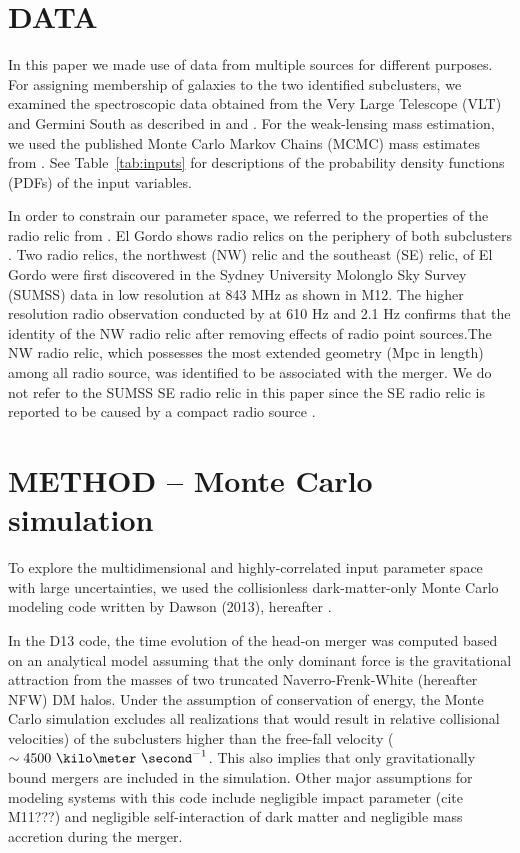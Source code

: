 \section{DATA} 
In this paper we made use of data from multiple sources for different
purposes. For assigning membership of galaxies to the two identified subclusters, we
examined the spectroscopic data obtained from the Very Large Telescope (VLT) and
Germini South as described in  and \citet{Sifon13}.
For the weak-lensing mass estimation, we used the published
Monte Carlo Markov Chains (MCMC) mass estimates from .
See Table~\ref{tab:inputs} for descriptions of the probability density
functions (PDFs) of the input
variables. \par 
In order to constrain our parameter space, we referred to the properties of
the radio relic from \citet{L13}. El Gordo shows radio relics on the
periphery of both subclusters . Two radio relics, the
northwest (NW) relic and the southeast (SE) relic, of El Gordo were first
discovered in the Sydney University Molonglo Sky Survey (SUMSS) data in low
resolution at 843 MHz \citep{Mauch03} as shown in M12. The higher
resolution radio observation conducted by \cite{L13} at 610 \mega Hz and
2.1 \giga Hz confirms that the identity of the NW radio relic
after removing effects of radio point sources.The NW radio relic, which
possesses the most extended geometry (Mpc in length)
among all radio source, was identified to be associated with the
merger. We do not refer to the SUMSS SE radio relic in this paper since the
SE radio relic is reported to be caused by a compact radio source \citep{L13}.    
%

\section{METHOD -- Monte Carlo simulation} 
%
To explore the multidimensional and highly-correlated input parameter space
with large uncertainties, we used the collisionless 
dark-matter-only Monte Carlo modeling code written by Dawson (2013),
hereafter . 




In the D13 code, the time evolution of the
head-on merger was computed based on an analytical model assuming that the
only dominant force is the gravitational attraction from the masses of two
truncated Naverro-Frenk-White (hereafter NFW) DM halos. 
Under the assumption of conservation of energy, the Monte Carlo simulation
excludes all realizations that would result in relative collisional
velocities) of the subclusters higher than the free-fall velocity ($\sim
4500~\kilo\meter~\second^{-1}$. This also implies that only
gravitationally bound mergers are included in the simulation.
Other major assumptions for modeling systems with this code include
negligible impact parameter (cite M11???) and negligible self-interaction
of dark matter and negligible mass accretion during the merger. 
\par

